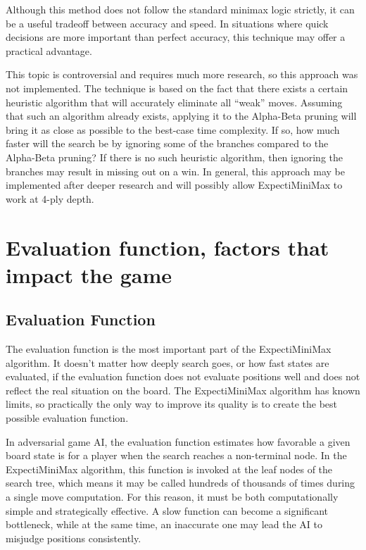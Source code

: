 Although this method does not follow the standard minimax logic strictly, it can be a useful tradeoff between accuracy and speed. In situations where quick decisions are more important than perfect accuracy, this technique may offer a practical advantage.

This topic is controversial and requires much more research, so this approach was not implemented. The technique is based on the fact that there exists a certain heuristic algorithm that will accurately eliminate all “weak” moves. Assuming that such an algorithm already exists, applying it to the Alpha-Beta pruning will bring it as close as possible to the best-case time complexity. If so, how much faster will the search be by ignoring some of the branches compared to the Alpha-Beta pruning? If there is no such heuristic algorithm, then ignoring the branches may result in missing out on a win. In general, this approach may be implemented after deeper research and will possibly allow ExpectiMiniMax to work at 4-ply depth.

\chapter{Evaluation function, factors that impact the game}\label{Evaluation}

\section{Evaluation Function}
The evaluation function is the most important part of the ExpectiMiniMax algorithm. It doesn't matter how deeply search goes, or how fast states are evaluated, if the evaluation function does not evaluate positions well and does not reflect the real situation on the board. The ExpectiMiniMax algorithm has known limits, so practically the only way to improve its quality is to create the best possible evaluation function.


In adversarial game AI, the evaluation function estimates how favorable a given board state is for a player when the search reaches a non-terminal node. In the ExpectiMiniMax algorithm, this function is invoked at the leaf nodes of the search tree, which means it may be called hundreds of thousands of times during a single move computation. For this reason, it must be both computationally simple and strategically effective. A slow function can become a significant bottleneck, while at the same time, an inaccurate one may lead the AI to misjudge positions consistently.

